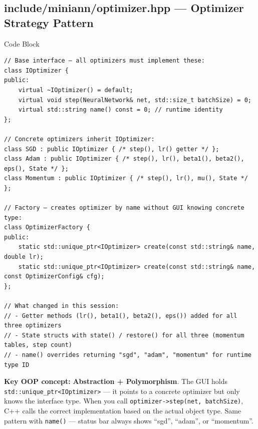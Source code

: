 \documentclass[12pt]{article}
\begin{document}
\subsection{include/miniann/optimizer.hpp — Optimizer Strategy Pattern}
\begin{codebox}{Code Block}
\begin{lstlisting}
// Base interface — all optimizers must implement these:
class IOptimizer {
public:
    virtual ~IOptimizer() = default;
    virtual void step(NeuralNetwork& net, std::size_t batchSize) = 0;
    virtual std::string name() const = 0; // runtime identity
};

// Concrete optimizers inherit IOptimizer:
class SGD : public IOptimizer { /* step(), lr() getter */ };
class Adam : public IOptimizer { /* step(), lr(), beta1(), beta2(), eps(), State */ };
class Momentum : public IOptimizer { /* step(), lr(), mu(), State */ };

// Factory — creates optimizer by name without GUI knowing concrete type:
class OptimizerFactory {
public:
    static std::unique_ptr<IOptimizer> create(const std::string& name, double lr);
    static std::unique_ptr<IOptimizer> create(const std::string& name, const OptimizerConfig& cfg);
};

// What changed in this session:
// - Getter methods (lr(), beta1(), beta2(), eps()) added for all three optimizers
// - State structs with state() / restore() for all three (momentum tables, step count)
// - name() overrides returning "sgd", "adam", "momentum" for runtime type ID
\end{lstlisting}
\end{codebox}

\textbf{Key OOP concept:} \textbf{Abstraction + Polymorphism}. The GUI holds \texttt{std::unique\_ptr<IOptimizer>} — it points to a concrete optimizer but only knows the interface type. When you call \texttt{optimizer->step(net, batchSize)}, C++ calls the correct implementation based on the actual object type. Same pattern with \texttt{name()} — status bar always shows ``sgd'', ``adam'', or ``momentum''.
\end{document}
